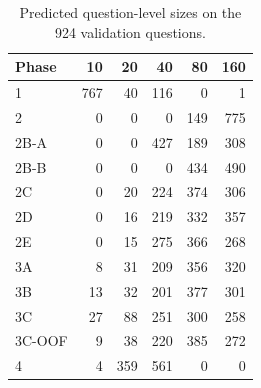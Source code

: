 \begin{table}[htbp]
\centering\small
\caption{Predicted question-level sizes on the 924 validation questions.}
\label{tab:predictioncounts}
\begin{tabular}{@{}lrrrrr@{}}
\toprule
Phase & 10 & 20 & 40 & 80 & 160\\
\midrule
1 & 767 & 40 & 116 & 0 & 1\\
2 & 0 & 0 & 0 & 149 & 775\\
2B-A & 0 & 0 & 427 & 189 & 308\\
2B-B & 0 & 0 & 0 & 434 & 490\\
2C & 0 & 20 & 224 & 374 & 306\\
2D & 0 & 16 & 219 & 332 & 357\\
2E & 0 & 15 & 275 & 366 & 268\\
3A & 8 & 31 & 209 & 356 & 320\\
3B & 13 & 32 & 201 & 377 & 301\\
3C & 27 & 88 & 251 & 300 & 258\\
3C-OOF & 9 & 38 & 220 & 385 & 272\\
4 & 4 & 359 & 561 & 0 & 0\\
\bottomrule
\end{tabular}
\end{table}
